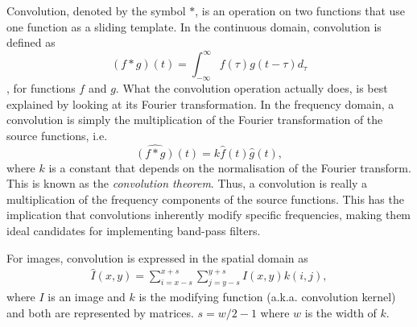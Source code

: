 Convolution, denoted by the symbol $*$, is an operation on two functions that use one function as a sliding template. In the continuous domain, convolution is defined as
\begin{equation}
    (f*g)(t) = \int_{-\infty}^\infty f(\tau)g(t-\tau)d_\tau
\end{equation},
for functions $f$ and $g$. 
What the convolution operation actually does, is best explained by looking at its Fourier transformation. In the frequency domain, a convolution is simply the multiplication of the Fourier transformation of the source functions, i.e.
\begin{equation}
    \widehat{(f*g)}(t) = k\hat{f}(t)\hat{g}(t),
\end{equation}
where $k$ is a constant that depends on the normalisation of the Fourier transform. This is known as the \emph{convolution theorem}. Thus, a convolution is really a multiplication of the frequency components of the source functions. This has the implication that convolutions inherently modify specific frequencies, making them ideal candidates for implementing band-pass filters. 

For images, convolution is expressed in the spatial domain as
\begin{align}
    \hat{I}(x, y) = \sum_{i=x-s}^{x+s}\sum_{j=y-s}^{y+s} I(x,y)k(i,j),
\end{align}
where $I$ is an image and $k$ is the modifying function (a.k.a. convolution kernel) and both are represented by matrices. $s=w/2 -1$ where $w$ is the width of $k$.





